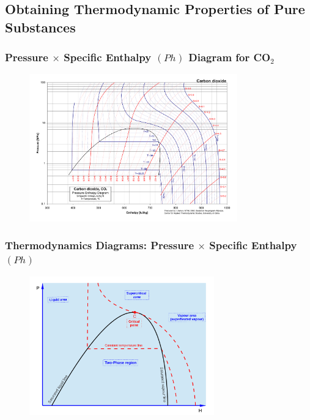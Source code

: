\documentclass[10pt,compress,unknownkeysallowed]{beamer}
\begin{document}
\subsection{Obtaining Thermodynamic Properties of Pure Substances}
\begin{frame}
 \frametitle{Pressure $\times$ Specific Enthalpy $(Ph)$ Diagram for CO$_{2}$}
  \begin{center}
   \begin{figure}
     \includegraphics[width=9cm,height=8.cm,clip]{../Pics/CO2col}
   \end{figure}
   \end{center}
\end{frame}

\begin{frame}
 \frametitle{Thermodynamics Diagrams: Pressure $\times$ Specific Enthalpy $(Ph)$}
  \begin{center}
   \begin{figure}
      \includegraphics[width=8cm,height=7.cm,clip]{../Pics/Overview_Refrig18}
   \end{figure}
   \end{center}
\end{frame}
\end{document}
